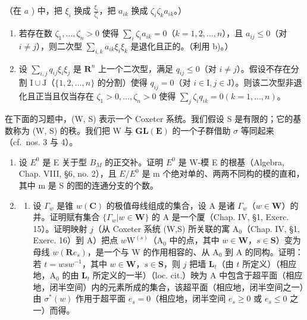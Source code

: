 （在 \(a\) ) 中，把 \(\xi_{i}\) 换成 \(\frac{\xi_i}{\zeta_i}\)，把 \(a_{ik}\) 换成 \(\zeta_i\zeta_k a_{ik}\)。）

\begin{enumerate}
\def\labelenumi{\alph{enumi})}
\setcounter{enumi}{2}
\item
  若存在数 \(\zeta_1, \ldots, \zeta_n > 0\) 使得 \(\sum_{i} \zeta_i a_{ik} = 0\)（\(k = 1, 2, \ldots, n\)），且 \(a_{ij} \leqslant 0\)（对 \(i \neq j\)），则二次型 \(\sum_{i,k} a_{ik} \xi_i \xi_k\) 是退化且正的。（利用 b)。）
\item
  设 \(\sum_{i,j} q_{ij} \xi_i \xi_j\) 是 \(\mathbf{R}^n\) 上一个二次型，满足 \(q_{ij} \leqslant 0\)（对 \(i \neq j\)）。假设不存在分割 \(\mathrm{I} \cup \mathrm{J}\)（\(\{1,2,\ldots,n\}\) 的分割）使得 \(q_{ij} = 0\)（对 \(i \in \mathrm{I}, j \in \mathrm{J}\)）。则该二次型非退化且正当且仅当存在 \(\zeta_1 > 0, \ldots, \zeta_n > 0\) 使得 \(\sum_{j} \zeta_i q_{ik} = 0 (k = 1, \ldots, n)\)。
\end{enumerate}


在下面的习题中，(W, S) 表示一个 Coxeter 系统。我们假设 S 是有限的；它的基数称为 (W, S) 的秩。我们把 W 与 \(\mathbf{GL}(\mathbf{E})\) 的一个子群借助 \(\sigma\) 等同起来（cf.~nos. 3 与 4）。

\begin{enumerate}
\def\labelenumi{\arabic{enumi})}
\item
  设 \(E^{0}\) 是 E 关于型 \(B_{M}\) 的正交补。证明 \(E^{0}\) 是 W-模 E 的根基（Algebra, Chap. VIII, §6, no. 2），且 \(E/E^{0}\) 是 m 个绝对单的、两两不同构的模的直和，其中 m 是 S 的图的连通分支的个数。
\item
  \begin{enumerate}
  \def\labelenumii{\alph{enumii})}
  \tightlist
  \item
    设 \(\Gamma_w\) 是锥 \(w(\mathbf{C})\) 的极值母线组成的集合，设 A 是诸 \(\Gamma_w\)（\(w \in \mathbf{W}\)）的并。证明赋有集合 \(\{\Gamma_w | w \in \mathbf{W}\}\) 的 A 是一个厦（Chap. IV, §1, Exerc. 15）。证明映射 \(j\)（从 Coxeter 系统 (W,S) 所关联的寓 \(\mathrm{A}_0\)（Chap. IV, §1, Exerc. 16）到 A）把点 \(w\mathrm{W}^{(s)}\)（\(\mathrm{A}_0\) 中的点，其中 \(w \in \mathbf{W}\)，\(s \in \mathbf{S}\)）变为母线 \(w(\mathbf{R}e_s)\)，是一个与 W 的作用相容的、从 \(\mathrm{A}_0\) 到 A 的同构。证明：若 \(t = wsw^{-1}\)，其中 \(w \in \mathbf{W}\)，\(s \in \mathbf{S}\)，则 \(j\) 把墙 \(\mathbf{L}_t\)（由 \(t\) 所定义）（相应地，\(\mathrm{A}_0\) 的由 \(\mathbf{L}_t\) 所定义的一半）（loc. cit.）映为 A 中包含于超平面（相应地，闭半空间）内的元素所成的集合，该超平面（相应地，闭半空间之一）由 \(\sigma^*(w)\) 作用于超平面 \(e_s = 0\)（相应地，闭半空间 \(e_s \geqslant 0\) 或 \(e_s \leqslant 0\) 之一）而得。
  \end{enumerate}
\end{enumerate}

